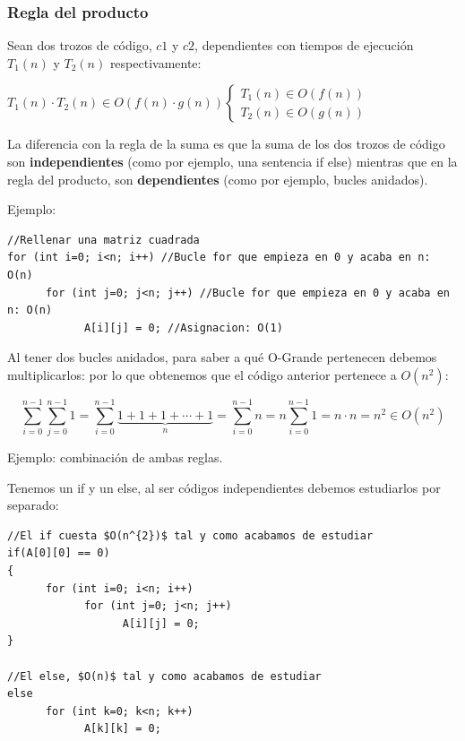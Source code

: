 \documentclass[10pt,a4paper,spanish]{report}
\begin{document}
\subsubsection{\textcolor[rgb]{0.1,0.2,0.6}Regla del producto}
\noindent
Sean dos trozos de código, $c1$ y $c2$, dependientes con tiempos de ejecución $T_{1}(n)$ y $T_{2}(n)$ respectivamente:

\begin{center}
$T_{1}(n) \cdot T_{2}(n) \in O(f(n) \cdot g(n)) \left\{ \begin{array}{ll}
T_{1}(n) \in O(f(n))\\
T_{2}(n) \in O(g(n))
\end{array} \right.$
\end{center}

\noindent
La diferencia con la regla de la suma es que la suma de los dos trozos de código son \textbf{\textcolor[rgb]{0.1,0.2,0.6}{independientes}} (como por ejemplo, una sentencia if else) mientras que en la regla del producto, son \textbf{\textcolor[rgb]{0.1,0.2,0.6}{dependientes}} (como por ejemplo, bucles anidados).

\noindent
Ejemplo:
\begin{verbatim}
//Rellenar una matriz cuadrada
for (int i=0; i<n; i++) //Bucle for que empieza en 0 y acaba en n: O(n)
      for (int j=0; j<n; j++) //Bucle for que empieza en 0 y acaba en n: O(n)
            A[i][j] = 0; //Asignacion: O(1)
\end{verbatim}

\noindent
Al tener dos bucles anidados, para saber a qué O-Grande pertenecen debemos multiplicarlos: por lo que obtenemos que el código anterior pertenece a $O(n^{2})$:

\begin{displaymath}
\sum_{i=0}^{n-1} \sum_{j=0}^{n-1} 1 = \sum_{i=0}^{n-1} \underbrace{1+1+1+ \cdots + 1}_{n} = \sum_{i=0}^{n-1} n = n \sum_{i=0}^{n-1} 1 = n \cdot n = n^{2} \in O(n^{2})
\end{displaymath}

\noindent
Ejemplo: combinación de ambas reglas.

\noindent
Tenemos un if y un else, al ser códigos independientes debemos estudiarlos por separado:
\begin{verbatim}
//El if cuesta $O(n^{2})$ tal y como acabamos de estudiar
if(A[0][0] == 0)
{
      for (int i=0; i<n; i++)
            for (int j=0; j<n; j++)
                  A[i][j] = 0;
}

//El else, $O(n)$ tal y como acabamos de estudiar
else
      for (int k=0; k<n; k++)
            A[k][k] = 0;
\end{verbatim}
\end{document}
